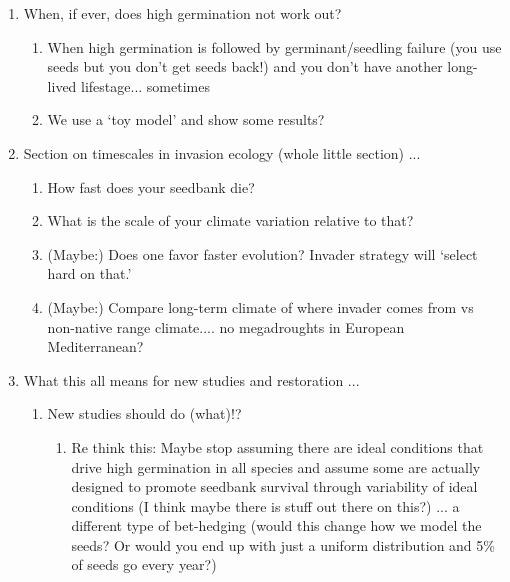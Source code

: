 \documentclass[11pt]{article}
\begin{document}
\begin{enumerate}
\begin{enumerate}
\item Germination and how it happens (define plasticity here) ...  better term for germination plasticity: they have a broad germination niche, they are environmental generalists (vs specialist) in regards to germination conditions %
\item Seedbanks and how they happen (survival of seeds, but also how much you germinate matters) ... persistence vs `losing' seeds to germination
\item Germination and seedbank survival are inversely related -- and this may be key for thinking about axes of potential strategies
\item Compare what invaders vs natives do
\end{enumerate}
\item When, if ever, does high germination not work out?
\begin{enumerate}
\item When high germination is followed by germinant/seedling failure (you use seeds but you don't get seeds back!) and you don't have another long-lived lifestage... sometimes
\item We use a `toy model' and show some results?
\end{enumerate}
\item Section on timescales in invasion ecology (whole little section) ...  
\begin{enumerate}
\item How fast does your seedbank die?
\item What is the scale of your climate variation relative to that? 
\item (Maybe:) Does one favor faster evolution? Invader strategy will `select hard on that.'
\item (Maybe:) Compare long-term climate of where invader comes from vs non-native range climate.... no megadroughts in European Mediterranean?
\end{enumerate}
\item What this all means for new studies and restoration ... 
\begin{enumerate}
\item New studies should do (what)!?
\begin{enumerate}
\item Re think this: Maybe stop assuming there are ideal conditions that drive high germination in all species and assume some are actually designed to promote seedbank survival through variability of ideal conditions (I think maybe there is stuff out there on this?) ... a different type of bet-hedging (would this change how we model the seeds? Or would you end up with just a uniform distribution and 5\% of seeds go every year?) 

\end{enumerate}
\end{enumerate}
\end{enumerate}
\end{document}
